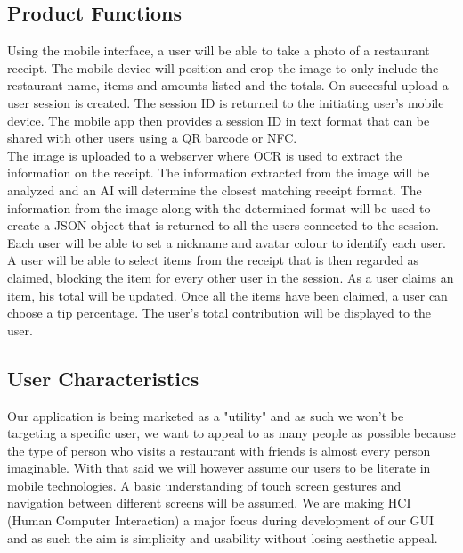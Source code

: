 \documentclass[12pt,a4paper]{article}
\begin{document}
   	\subsection{Product Functions}
		Using the mobile interface, a user will be able to take a photo of a restaurant receipt. The mobile device will position and crop the image to only include the restaurant name, items and amounts listed and the totals. On succesful upload a user session is created. The session ID is returned to the initiating user's mobile device. The mobile app then provides a session ID in text format that can be shared with other users using a QR barcode or NFC.\\
		The image is uploaded to a webserver where OCR is used to extract the information on the receipt. The information extracted from the image will be analyzed and an AI will determine the closest matching receipt format. The information from the image along with the determined format will be used to create a JSON object that is returned to all the users connected to the session.\\
		Each user will be able to set a nickname and avatar colour to identify each user. A user will be able to select items from the receipt that is then regarded as claimed, blocking the item for every other user in the session. As a user claims an item, his total will be updated. Once all the items have been claimed, a user can choose a tip percentage. The user's total contribution will be displayed to the user.

	\subsection{User Characteristics}

		Our application is being marketed as a "utility" and as such we won't be targeting a specific user, we want to appeal to as many people as possible because the type of person who visits a restaurant with friends is almost every person imaginable. With that said we will however assume our users to be literate in mobile technologies. A basic understanding of touch screen gestures and navigation between different screens will be assumed. We are making HCI (Human Computer Interaction) a major focus during development of our GUI and as such the aim is simplicity and usability without losing aesthetic appeal.
\end{document}
